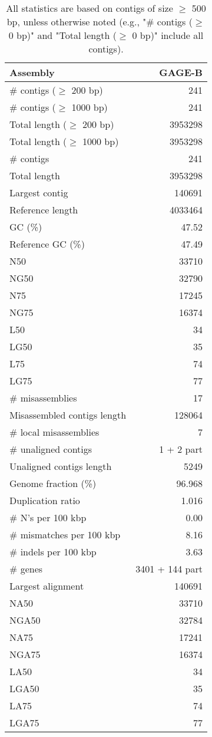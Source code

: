 \documentclass[12pt,a4paper]{article}
\begin{document}
\begin{table}[ht]
\begin{center}
\caption{All statistics are based on contigs of size $\geq$ 500 bp, unless otherwise noted (e.g., "\# contigs ($\geq$ 0 bp)" and "Total length ($\geq$ 0 bp)" include all contigs).}
\begin{tabular}{|l*{1}{|r}|}
\hline
Assembly & GAGE-B \\ \hline
\# contigs ($\geq$ 200 bp) & 241 \\ \hline
\# contigs ($\geq$ 1000 bp) & 241 \\ \hline
Total length ($\geq$ 200 bp) & 3953298 \\ \hline
Total length ($\geq$ 1000 bp) & 3953298 \\ \hline
\# contigs & 241 \\ \hline
Total length & 3953298 \\ \hline
Largest contig & 140691 \\ \hline
Reference length & 4033464 \\ \hline
GC (\%) & 47.52 \\ \hline
Reference GC (\%) & 47.49 \\ \hline
N50 & 33710 \\ \hline
NG50 & 32790 \\ \hline
N75 & 17245 \\ \hline
NG75 & 16374 \\ \hline
L50 & 34 \\ \hline
LG50 & 35 \\ \hline
L75 & 74 \\ \hline
LG75 & 77 \\ \hline
\# misassemblies & 17 \\ \hline
Misassembled contigs length & 128064 \\ \hline
\# local misassemblies & 7 \\ \hline
\# unaligned contigs & 1 + 2 part \\ \hline
Unaligned contigs length & 5249 \\ \hline
Genome fraction (\%) & 96.968 \\ \hline
Duplication ratio & 1.016 \\ \hline
\# N's per 100 kbp & 0.00 \\ \hline
\# mismatches per 100 kbp & 8.16 \\ \hline
\# indels per 100 kbp & 3.63 \\ \hline
\# genes & 3401 + 144 part \\ \hline
Largest alignment & 140691 \\ \hline
NA50 & 33710 \\ \hline
NGA50 & 32784 \\ \hline
NA75 & 17241 \\ \hline
NGA75 & 16374 \\ \hline
LA50 & 34 \\ \hline
LGA50 & 35 \\ \hline
LA75 & 74 \\ \hline
LGA75 & 77 \\ \hline
\end{tabular}
\end{center}
\end{table}
\end{document}
